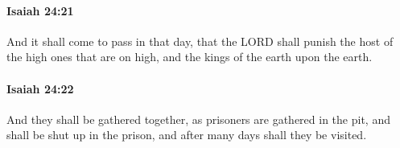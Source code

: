		\paragraph{Isaiah 24:21} %
			\label{ISAIAH-24-21}

			And it shall come to pass in that day, that the LORD shall punish the host of the high ones that are on high, and the kings of the earth upon the earth.


		\paragraph{Isaiah 24:22} %
			\label{ISAIAH-24-22}

			And they shall be gathered together, as prisoners are gathered in the pit, and shall be shut up in the prison, and after many days shall they be visited.


